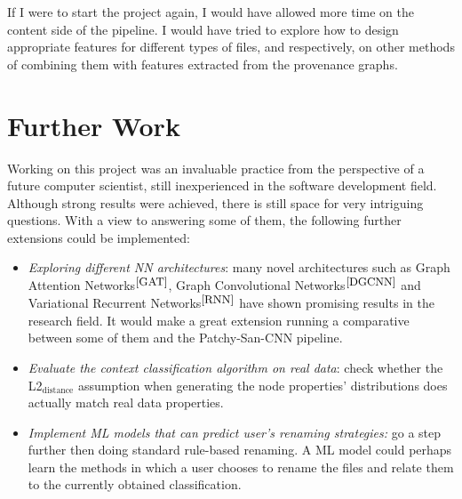    If I were to start the project again, I would have allowed more time on the content side of the pipeline. I would have tried to explore how to design appropriate features for different types of files, and respectively, on other methods of combining them with features extracted from the provenance graphs. \\ 
    
    \section{Further Work}
    
    Working on this project was an invaluable practice from the perspective of a future computer scientist, still inexperienced in the software development field. Although strong results were achieved, there is still space for very intriguing questions. With a view to answering some of them, the following further extensions could be implemented:
    
    \begin{itemize}
        \item \textit{Exploring different NN architectures}: many novel architectures such as Graph Attention Networks$^{\small \cite{GAT}}$, Graph Convolutional Networks$^{\small \cite{DGCNN}}$ and Variational Recurrent Networks$^{\small \cite{RNN}}$ have shown promising results in the research field. It would make a great extension running a comparative between some of them and the Patchy-San-CNN pipeline.
        
        \item \textit{Evaluate the context classification algorithm on real data}: check whether the L2$_{\text{distance}}$ assumption when generating the node properties' distributions does actually match real data properties. 
        
        \item \textit{Implement ML models that can predict user's renaming strategies:} go a step further then doing standard rule-based renaming. A ML model could perhaps learn the methods in which a user chooses to rename the files and relate them to the currently obtained classification.    
    
    \end{itemize}
    
